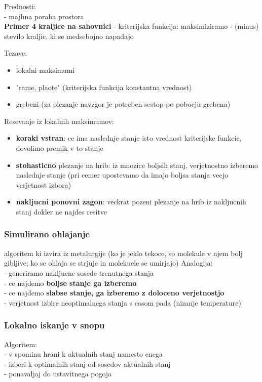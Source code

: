 Prednosti:\\
- majhna poraba prostora\\

\textbf{Primer 4 kraljice na sahovnici}
- kriterijska funkcija: maksimiziramo - (minus) stevilo kraljic, ki se medsebojno napadajo

Tezave:
\begin{itemize}[noitemsep,topsep=0pt,leftmargin=*]
    \item lokalni maksimumi
    \item "rame, plaote" (kriterijska funkcija konstantna vrednost)
    \item grebeni (za plezanje navzgor je potreben sestop po pobocju grebena)
\end{itemize}

Resevanje iz lokalnih maksimumov:
\begin{itemize}[noitemsep,topsep=0pt,leftmargin=*]
    \item \textbf{koraki vstran}: ce ima naslednje stanje isto vrednost kriterijske funkcie, dovolimo premik v to stanje
    \item \textbf{stohasticno} plezanje na hrib: iz mnozice boljsih stanj, verjetnostno izberemo naslednje stanje (pri cemer upostevamo da imajo boljsa stanja vecjo verjetnost izbora)
    \item \textbf{nakljucni ponovni zagon}: veckrat pozeni plezanje na hrib iz nakljucnih stanj dokler ne najdes resitve
\end{itemize}

\subsubsection{Simulirano ohlajanje}
algoritem ki izvira iz metalurgije (ko je jeklo tekoce, so molekule v njem bolj gibljive; ko se ohlaja se strjuje in molekuele se umirjajo)
Analogija:\\
- generiramo nakljucne sosede trenutnega stanja\\
- ce najdemo \textbf{boljse stanje ga izberemo}\\
- ce najdemo \textbf{slabse stanje, ga izberemo z doloceno verjetnostjo}\\
- verjetnost izbire neoptimalnega stanja s casom pada (nizanje temperature)

\subsubsection{Lokalno iskanje v snopu}
Algoritem:\\
- v spominu hrani k aktualnih stanj namesto enega\\
- izberi k optimalnih stanj od sosedov aktualnih stanj\\
- ponavaljaj do ustavitnega pogoja 

